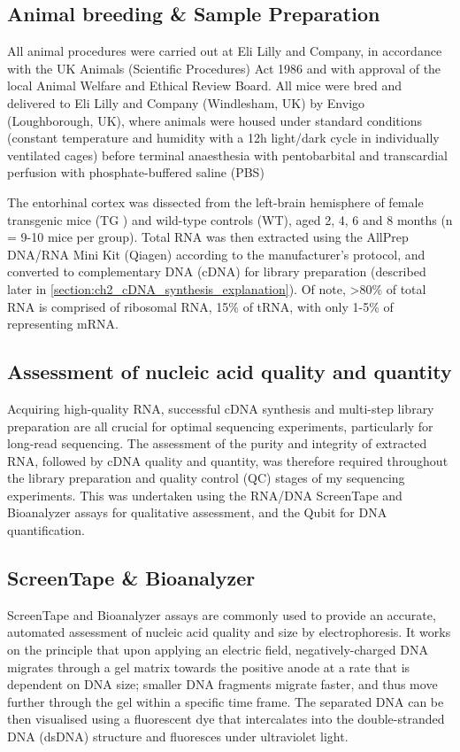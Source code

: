 \subsection{Animal breeding \& Sample Preparation}
All animal procedures were carried out at Eli Lilly and Company, in accordance with the UK Animals (Scientific Procedures) Act 1986 and with approval of the local Animal Welfare and Ethical Review Board. All mice were bred and delivered to Eli Lilly and Company (Windlesham, UK) by Envigo (Loughborough, UK), where animals were housed under standard conditions (constant temperature and humidity with a 12h light/dark cycle in individually ventilated cages) before terminal anaesthesia with pentobarbital and transcardial perfusion with phosphate-buffered saline (PBS)\cite{Castanho2020}

The entorhinal cortex was dissected from the left-brain hemisphere of female transgenic mice (TG ) and wild-type controls (WT), aged 2, 4, 6 and 8 months (n = 9-10 mice per group). Total RNA was then extracted\cite{Castanho2020} using the AllPrep DNA/RNA Mini Kit (Qiagen) according to the manufacturer's protocol, and converted to complementary DNA (cDNA) for library preparation (described later in \cref{section:ch2_cDNA_synthesis_explanation}). Of note, >80\% of total RNA is comprised of ribosomal RNA, 15\% of tRNA, with only 1-5\% of representing mRNA. 

\subsection{Assessment of nucleic acid quality and quantity}
Acquiring high-quality RNA, successful cDNA synthesis and multi-step library preparation are all crucial for optimal sequencing experiments, particularly for long-read sequencing. The assessment of the purity and integrity of extracted RNA, followed by cDNA quality and quantity, was therefore required throughout the library preparation and quality control (QC) stages of my sequencing experiments. This was undertaken using the RNA/DNA ScreenTape and Bioanalyzer assays for qualitative assessment, and the Qubit for DNA quantification. 


\subsection{ScreenTape \& Bioanalyzer}
\label{section:ch2_bioanalyzer} 
ScreenTape and Bioanalyzer assays are commonly used to provide an accurate, automated assessment of nucleic acid quality and size by electrophoresis. It works on the principle that upon applying an electric field, negatively-charged DNA migrates through a gel matrix towards the positive anode at a rate that is dependent on DNA size; smaller DNA fragments migrate faster, and thus move further through the gel within a specific time frame. The separated DNA can be then visualised using a fluorescent dye that intercalates into the double-stranded DNA (dsDNA) structure and fluoresces under ultraviolet light. 

